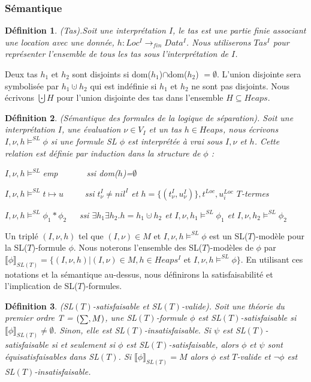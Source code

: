 \documentclass[11pt,openany]{article}
\newcommand\phibra{\llbracket\phi\rrbracket}
\newcommand\smallsum{\mathsmaller\sum}
\newtheorem{definition}{D\'efinition}[subsection]
\begin{document}
		\subsubsection{S\'emantique}
	\begin{definition}
	(Tas).Soit une interpr\'etation $I$, le tas est une partie finie associant une location avec une donn\'ee, $h : Loc^{I} \rightarrow_{fin} Data^{I}$. Nous utiliserons $Tas^{I}$ pour repr\'esenter l'ensemble de tous les tas sous l'interpr\'etation de $I$.
	\end{definition}
	Deux tas $h_{1}$ et $h_{2}$ sont disjoints si dom($h_{1}$)$\cap$dom($h_{2}$) $= \emptyset$. L'union disjointe sera symbolis\'ee par $h_{1}\cupdot h_{2}$ qui est ind\'efinie si $h_{1}$ et $h_{2}$ ne sont pas disjoints. Nous \'ecrivons $\bigcupdot H$ pour l'union disjointe des tas dans l'ensemble $H \subseteq Heaps$.
	\begin{definition}
	(S\'emantique des formules de la logique de s\'eparation). Soit une interpr\'etation $I$, une \'evaluation $\nu\in V_{I}$ et un tas $h\in Heaps$, nous \'ecrivons $I,\nu,h\models^{SL}\phi$ si une formule SL $\phi$ est interpr\'et\'ee \`a vrai sous $I,\nu$ et $h$. Cette relation est d\'efinie par induction  dans la structure de $\phi$ :
	
$I,\nu,h\models^{SL}$emp ~~~~~~ssi dom($h$)=$\emptyset$

$I,\nu,h\models^{SL}t\mapsto u$~~~~~ssi $t^{I}_{\nu}\neq nil^{I}$ et $h = \{(t^{I}_{\nu},u^{I}_{\nu} )\}, t^{Loc}, u^{Loc}_{i}$ $T$-termes

$I,\nu,h\models^{SL}\phi_{1}*\phi_{2}$~~~ssi $\exists h_{1}\exists h_{2}.h=h_{1}\cupdot h_{2}$ et $I,\nu,h_{1}\models^{SL}\phi_{1}$ et $I,\nu,h_{2}\models^{SL}\phi_{2}$

	\end{definition}
	Un tripl\'e $(I,\nu,h)$ tel que $(I,\nu)\in M$ et $I,\nu,h\models^{SL}\phi$ est un SL($T$)-mod\`ele pour la SL($T$)-formule $\phi$. Nous noterons l'ensemble des SL($T$)-mod\`eles de $\phi$ par $\phibra_{SL(T)} = \{(I,\nu,h)|(I,\nu)\in M,h\in Heaps^{I}$ et $I,\nu,h\models^{SL}\phi\}$. En utilisant ces notations et la s\'emantique au-dessus, nous d\'efinirons la satisfaisabilit\'e et l'implication de SL($T$)-formules.
\begin{definition}
(SL$(T)$-satisfaisable et SL$(T)$-valide). Soit une th\'eorie du premier ordre T = $(\smallsum,M)$, une SL$(T)$-formule $\phi$ est SL$(T)$-satisfaisable si $\phibra_{SL(T)}\neq\emptyset$. Sinon, elle est SL$(T)$-insatisfaisable. Si $\psi$ est SL$(T)$-satisfaisable si et seulement si $\phi$ est SL$(T)$-satisfaisable, alors $\phi$ et $\psi$ sont \textit{\'equisatisfaisables} dans SL$(T)$. Si $\phibra_{SL(T)}=M$ alors $\phi$ est $T$-valide et $\neg\phi$ est SL$(T)$-insatisfaisable.
\end{definition}
\end{document}
